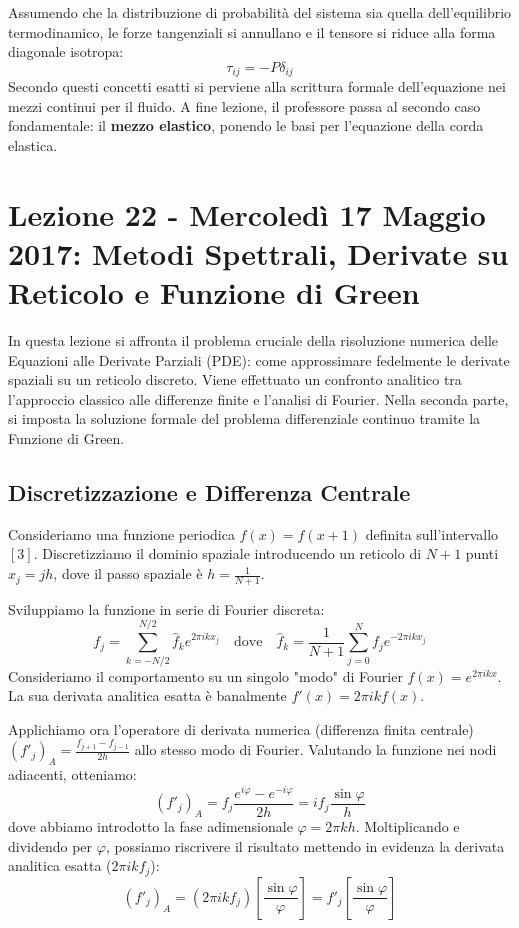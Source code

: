\documentclass[12pt,a4paper]{article}
\begin{document}
Assumendo che la distribuzione di probabilità del sistema sia quella dell'equilibrio termodinamico, le forze tangenziali si annullano e il tensore si riduce alla forma diagonale isotropa:
\begin{equation}
\tau_{ij} = -P \delta_{ij}
\end{equation}
Secondo questi concetti esatti si perviene alla scrittura formale dell'equazione nei mezzi continui per il fluido. A fine lezione, il professore passa al secondo caso fondamentale: il \textbf{mezzo elastico}, ponendo le basi per l'equazione della corda elastica.

\newpage
\section{Lezione 22 - Mercoledì 17 Maggio 2017: Metodi Spettrali, Derivate su Reticolo e Funzione di Green}

In questa lezione si affronta il problema cruciale della risoluzione numerica delle Equazioni alle Derivate Parziali (PDE): come approssimare fedelmente le derivate spaziali su un reticolo discreto. Viene effettuato un confronto analitico tra l'approccio classico alle differenze finite e l'analisi di Fourier. Nella seconda parte, si imposta la soluzione formale del problema differenziale continuo tramite la Funzione di Green.

\subsection{Discretizzazione e Differenza Centrale}
Consideriamo una funzione periodica $f(x) = f(x+1)$ definita sull'intervallo $[3]$. Discretizziamo il dominio spaziale introducendo un reticolo di $N+1$ punti $x_j = j h$, dove il passo spaziale è $h = \frac{1}{N+1}$.

Sviluppiamo la funzione in serie di Fourier discreta:
\begin{equation}
f_j = \sum_{k=-N/2}^{N/2} \hat{f}_k e^{2\pi i k x_j} \quad \text{dove} \quad \hat{f}_k = \frac{1}{N+1} \sum_{j=0}^{N} f_j e^{-2\pi i k x_j}
\end{equation}
Consideriamo il comportamento su un singolo "modo" di Fourier $f(x) = e^{2\pi i k x}$. La sua derivata analitica esatta è banalmente $f'(x) = 2\pi i k f(x)$.

Applichiamo ora l'operatore di derivata numerica (differenza finita centrale) $(f'_j)_A = \frac{f_{j+1} - f_{j-1}}{2h}$ allo stesso modo di Fourier. Valutando la funzione nei nodi adiacenti, otteniamo:
\begin{equation}
(f'_j)_A = f_j \frac{e^{i\varphi} - e^{-i\varphi}}{2h} = i f_j \frac{\sin \varphi}{h}
\end{equation}
dove abbiamo introdotto la fase adimensionale $\varphi = 2\pi k h$. Moltiplicando e dividendo per $\varphi$, possiamo riscrivere il risultato mettendo in evidenza la derivata analitica esatta ($2\pi i k f_j$):
\begin{equation}
(f'_j)_A = (2\pi i k f_j) \left[ \frac{\sin \varphi}{\varphi} \right] = f'_j \left[ \frac{\sin \varphi}{\varphi} \right]
\end{equation}
\end{document}
